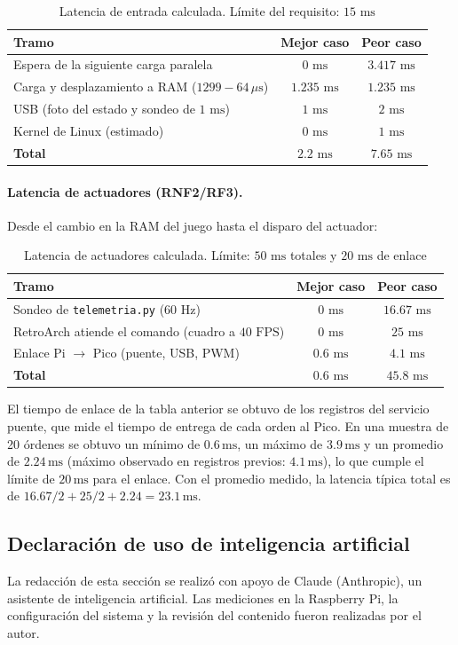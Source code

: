 \begin{table}[H]
	\centering
	\caption{Latencia de entrada calculada. Límite del requisito: $15\text{ ms}$}
	\label{tab:lat_entrada}
	\footnotesize
	\begin{tabular}{|l|c|c|}
		\hline
		\textbf{Tramo} & \textbf{Mejor caso} & \textbf{Peor caso} \\
		\hline
		Espera de la siguiente carga paralela & $0\text{ ms}$ & $3.417\text{ ms}$ \\
		\hline
		Carga y desplazamiento a RAM ($1299 - 64\,\mu\text{s}$) & $1.235\text{ ms}$ & $1.235\text{ ms}$ \\
		\hline
		USB (foto del estado y sondeo de $1\text{ ms}$) & $1\text{ ms}$ & $2\text{ ms}$ \\
		\hline
		Kernel de Linux (estimado) & $0\text{ ms}$ & $1\text{ ms}$ \\
		\hline
		\textbf{Total} & \textbf{$2.2\text{ ms}$} & \textbf{$7.65\text{ ms}$} \\
		\hline
	\end{tabular}
\end{table}

\paragraph{Latencia de actuadores (RNF2/RF3).}
Desde el cambio en la RAM del juego hasta el disparo del actuador:

\begin{table}[H]
	\centering
	\caption{Latencia de actuadores calculada. Límite: $50\text{ ms}$ totales y $20\text{ ms}$ de enlace}
	\label{tab:lat_actuadores}
	\footnotesize
	\begin{tabular}{|l|c|c|}
		\hline
		\textbf{Tramo} & \textbf{Mejor caso} & \textbf{Peor caso} \\
		\hline
		Sondeo de \texttt{telemetria.py} ($60\text{ Hz}$) & $0\text{ ms}$ & $16.67\text{ ms}$ \\
		\hline
		RetroArch atiende el comando (cuadro a $40\text{ FPS}$) & $0\text{ ms}$ & $25\text{ ms}$ \\
		\hline
		Enlace Pi $\rightarrow$ Pico (puente, USB, PWM) & $0.6\text{ ms}$ & $4.1\text{ ms}$ \\
		\hline
		\textbf{Total} & \textbf{$0.6\text{ ms}$} & \textbf{$45.8\text{ ms}$} \\
		\hline
	\end{tabular}
\end{table}

El tiempo de enlace de la tabla anterior se obtuvo de los registros del servicio puente, que mide el tiempo de entrega de cada orden al Pico. En una muestra de 20 órdenes se obtuvo un mínimo de $0.6\,\mathrm{ms}$, un máximo de $3.9\,\mathrm{ms}$ y un promedio de $2.24\,\mathrm{ms}$ (máximo observado en registros previos: $4.1\,\mathrm{ms}$), lo que cumple el límite de $20\,\mathrm{ms}$ para el enlace. Con el promedio medido, la latencia típica total es de $16.67/2 + 25/2 + 2.24 = 23.1\,\mathrm{ms}$.

\subsection*{Declaración de uso de inteligencia artificial}
La redacción de esta sección se realizó con apoyo de Claude (Anthropic), un asistente de inteligencia artificial. Las mediciones en la Raspberry Pi, la configuración del sistema y la revisión del contenido fueron realizadas por el autor.
